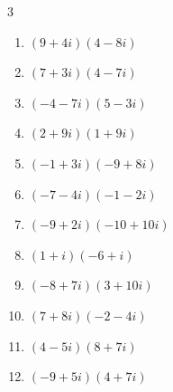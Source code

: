 \begin{multicols}{3}
\begin{enumerate}
        \phantom{$\displaystyle =90-6i$}

\columnbreak %

\resetques

  \item $\displaystyle (9+4i)(4-8i)$

        \phantom{$\displaystyle =68-56i$}

  \item $\displaystyle (7+3i)(4-7i)$

        \phantom{$\displaystyle =49-37i$}

  \item $\displaystyle (-4-7i)(5-3i)$

        \phantom{$\displaystyle =-41-23i$}

  \item $\displaystyle (2+9i)(1+9i)$

        \phantom{$\displaystyle =-79+27i$}

  \item $\displaystyle (-1+3i)(-9+8i)$

        \phantom{$\displaystyle =-15-35i$}

  \item $\displaystyle (-7-4i)(-1-2i)$

        \phantom{$\displaystyle =-1+18i$}

  \item $\displaystyle (-9+2i)(-10+10i)$

        \phantom{$\displaystyle =70-110i$}

  \item $\displaystyle (1+i)(-6+i)$

        \phantom{$\displaystyle =-7-5i$}

  \item $\displaystyle (-8+7i)(3+10i)$

        \phantom{$\displaystyle =-94-59i$}

  \item $\displaystyle (7+8i)(-2-4i)$

        \phantom{$\displaystyle =18-44i$}

  \item $\displaystyle (4-5i)(8+7i)$

        \phantom{$\displaystyle =67-12i$}

  \item $\displaystyle (-9+5i)(4+7i)$

        \phantom{$\displaystyle =-71-43i$}


\end{enumerate}
\end{multicols}
